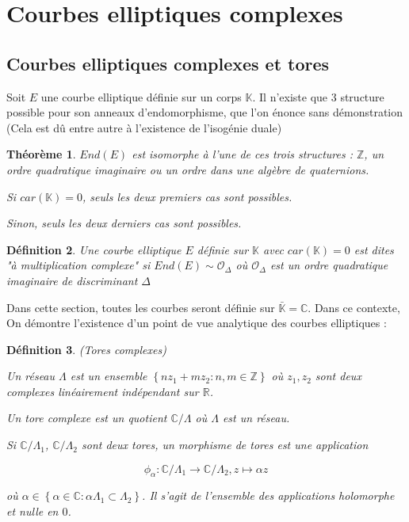 \documentclass{article}
\newcommand{\Z}[0]{\mathbb{Z}}
\newcommand{\R}[0]{\mathbb{R}}
\newcommand{\C}[0]{\mathbb{C}}
\newcommand{\K}[0]{\mathbb{K}}
\newcommand{\Kb}[0]{\bar{\K}}
\newcommand{\OR}[0]{\mathcal{O}}
\newtheorem{The}{Théorème}[section]
\newtheorem{Def}[The]{Définition}
\begin{document}
\section{Courbes elliptiques complexes}





\subsection{Courbes elliptiques complexes et tores}

Soit $E$ une courbe elliptique définie sur un corps $\K$. Il n'existe que $3$ structure possible pour son anneaux d'endomorphisme, que l'on énonce sans démonstration (Cela est dû entre autre à l'existence de l'isogénie duale)

\begin{The}
	$End(E)$ est isomorphe à l'une de ces trois structures : $\Z$, un ordre quadratique imaginaire ou un ordre dans une algèbre de quaternions.
	
	Si $car(\K) = 0$, seuls les deux premiers cas sont possibles.
	
	Sinon, seuls les deux derniers cas sont possibles. 
\end{The}

\begin{Def}
	Une courbe elliptique $E$ définie sur $\K$ avec $car(\K) = 0$ est dites "à multiplication complexe" si $End(E)\sim \OR_{\Delta}$ où $\OR_{\Delta}$ est un ordre quadratique imaginaire de discriminant $\Delta$
\end{Def}


Dans cette section, toutes les courbes seront définie sur $\Kb = \C$. Dans ce contexte, On démontre l'existence d'un point de vue analytique des courbes elliptiques :

\begin{Def}
	(Tores complexes)
	
	Un réseau $\Lambda$ est un ensemble $\left\lbrace nz_1 + mz_2 : n,m\in\Z\right\rbrace $ où $z_1 ,z_2$ sont deux complexes linéairement indépendant sur $\R$.
	
	Un tore complexe est un quotient $\C/\Lambda$ où $\Lambda$ est un réseau. 
	
	Si $\C/\Lambda_1$, $\C/\Lambda_2$ sont deux tores, un morphisme de tores est une application 
	
	\begin{equation*}
		\phi_{\alpha} : \C/\Lambda_1 \rightarrow \C/\Lambda_2 , z \mapsto \alpha z
	\end{equation*}
	
	où $\alpha\in\left\lbrace \alpha\in\C : \alpha\Lambda_1 \subset \Lambda_2\right\rbrace $. Il s'agit de l'ensemble des applications holomorphe et nulle en $0$. 
	
\end{Def}
\end{document}
